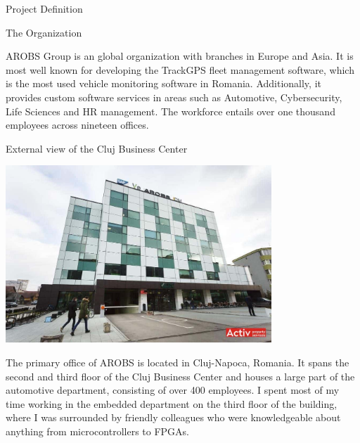 \documentclass{matthijs}
\begin{document}
	\begin{hoofdstuk}{Project Definition}

		\setlength\parindent{1.5em}
		\setlength{\parskip}{0.5em plus 0.2em minus 0.1em}
		\linespread{1.2}
		\vspace{-2.5ex}
		\begin{paragraaf}{The Organization}

			AROBS Group is an global organization with branches in Europe and Asia.
			It is most well known for developing the TrackGPS fleet management software, which is the most used vehicle monitoring software in Romania.
			Additionally, it provides custom software services in areas such as Automotive, Cybersecurity, Life Sciences and HR management.
			The workforce entails over one thousand employees across nineteen offices.

			\vspace{0.3ex}
			\begin{figuur}{External view of the Cluj Business Center}

				\includegraphics[width=0.75\textwidth, clip, trim=0cm 2cm 0cm 0cm]{cbc.jpg}

			\end{figuur}
			\vspace{-0.2ex}

			\noindent The primary office of AROBS is located in Cluj-Napoca, Romania. 
			It spans the second and third floor of the Cluj Business Center and houses a large part of the automotive department, consisting of over 400 employees.
			I spent most of my time working in the embedded department on the third floor of the building, where I was surrounded by friendly colleagues who were knowledgeable about anything from microcontrollers to FPGAs.
			

\end{paragraaf}
\end{hoofdstuk}
\end{document}
